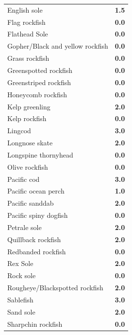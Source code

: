 \documentclass[11pt,
  english,
  a4paper,
]{article}
\begin{document}
\begin{longtable}[t]{>{\raggedright\arraybackslash}p{8cm}>{}c}
English sole & \textcolor[HTML]{2EB37C}{\textbf{1.5}}\\
Flag rockfish & \textcolor[HTML]{35608D}{\textbf{0.0}}\\
Flathead Sole & \textcolor[HTML]{35608D}{\textbf{0.0}}\\
Gopher/Black and yellow rockfish & \textcolor[HTML]{35608D}{\textbf{0.0}}\\
Grass rockfish & \textcolor[HTML]{35608D}{\textbf{0.0}}\\
Greenspotted rockfish & \textcolor[HTML]{35608D}{\textbf{0.0}}\\
Greenstriped rockfish & \textcolor[HTML]{35608D}{\textbf{0.0}}\\
Honeycomb rockfish & \textcolor[HTML]{35608D}{\textbf{0.0}}\\
Kelp greenling & \textcolor[HTML]{66CB5D}{\textbf{2.0}}\\
Kelp rockfish & \textcolor[HTML]{35608D}{\textbf{0.0}}\\
Lingcod & \textcolor[HTML]{FDE725}{\textbf{3.0}}\\
Longnose skate & \textcolor[HTML]{66CB5D}{\textbf{2.0}}\\
Longspine thornyhead & \textcolor[HTML]{35608D}{\textbf{0.0}}\\
Olive rockfish & \textcolor[HTML]{35608D}{\textbf{0.0}}\\
Pacific cod & \textcolor[HTML]{FDE725}{\textbf{3.0}}\\
Pacific ocean perch & \textcolor[HTML]{1F988B}{\textbf{1.0}}\\
Pacific sanddab & \textcolor[HTML]{66CB5D}{\textbf{2.0}}\\
Pacific spiny dogfish & \textcolor[HTML]{35608D}{\textbf{0.0}}\\
Petrale sole & \textcolor[HTML]{66CB5D}{\textbf{2.0}}\\
Quillback rockfish & \textcolor[HTML]{66CB5D}{\textbf{2.0}}\\
Redbanded rockfish & \textcolor[HTML]{35608D}{\textbf{0.0}}\\
Rex Sole & \textcolor[HTML]{66CB5D}{\textbf{2.0}}\\
Rock sole & \textcolor[HTML]{35608D}{\textbf{0.0}}\\
Rougheye/Blackspotted rockfish & \textcolor[HTML]{66CB5D}{\textbf{2.0}}\\
Sablefish & \textcolor[HTML]{FDE725}{\textbf{3.0}}\\
Sand sole & \textcolor[HTML]{66CB5D}{\textbf{2.0}}\\
Sharpchin rockfish & \textcolor[HTML]{35608D}{\textbf{0.0}}\\

\end{longtable}
\end{document}
